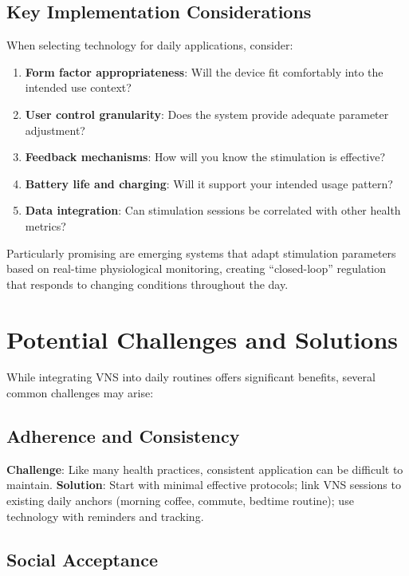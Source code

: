 \documentclass[
  Letterpaper,
]{scrbook}
\providecommand{\tightlist}{%
  \setlength{\itemsep}{0pt}\setlength{\parskip}{0pt}}\usepackage{longtable,booktabs,array}
\begin{document}
\subsection{Key Implementation
Considerations}\label{key-implementation-considerations}

When selecting technology for daily applications, consider:

\begin{enumerate}
\def\labelenumi{\arabic{enumi}.}
\tightlist
\item
  \textbf{Form factor appropriateness}: Will the device fit comfortably
  into the intended use context?
\item
  \textbf{User control granularity}: Does the system provide adequate
  parameter adjustment?
\item
  \textbf{Feedback mechanisms}: How will you know the stimulation is
  effective?
\item
  \textbf{Battery life and charging}: Will it support your intended
  usage pattern?
\item
  \textbf{Data integration}: Can stimulation sessions be correlated with
  other health metrics?
\end{enumerate}

Particularly promising are emerging systems that adapt stimulation
parameters based on real-time physiological monitoring, creating
``closed-loop'' regulation that responds to changing conditions
throughout the day.

\section{Potential Challenges and
Solutions}\label{potential-challenges-and-solutions}

While integrating VNS into daily routines offers significant benefits,
several common challenges may arise:

\subsection{Adherence and Consistency}\label{adherence-and-consistency}

\textbf{Challenge}: Like many health practices, consistent application
can be difficult to maintain. \textbf{Solution}: Start with minimal
effective protocols; link VNS sessions to existing daily anchors
(morning coffee, commute, bedtime routine); use technology with
reminders and tracking.

\subsection{Social Acceptance}\label{social-acceptance}
\end{document}
